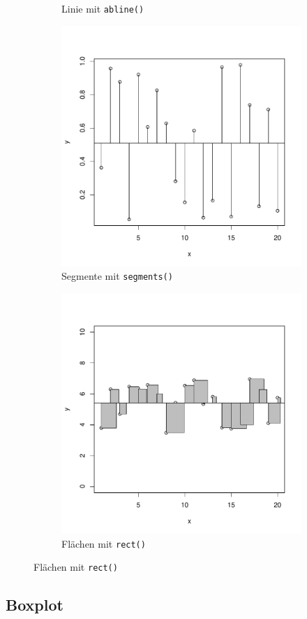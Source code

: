 \begin{figure}[h!]
\begin{subfigure}[b]{0.48\textwidth}
\caption{Linie mit \lstinline{abline()}}
\end{subfigure}

\begin{subfigure}[b]{0.48\textwidth}
\includegraphics{r-cmd-016}
\caption{Segmente mit \lstinline{segments()}}
\end{subfigure}
\begin{subfigure}[b]{0.48\textwidth}
\includegraphics{r-cmd-017}
\caption{Flächen mit \lstinline{rect()}}
\end{subfigure}

\end{figure}

\subsection{Boxplot}
